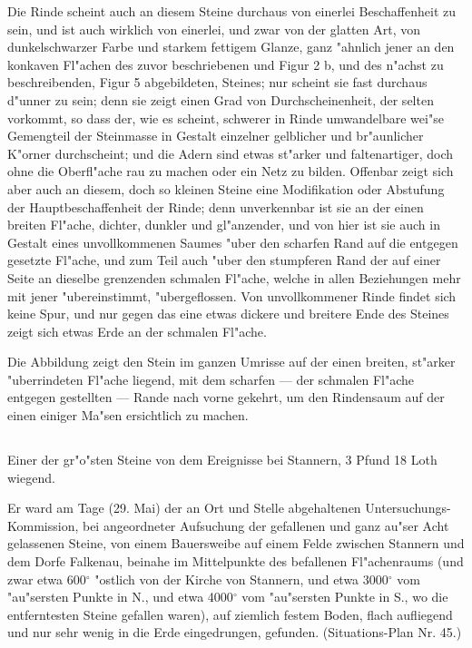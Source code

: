\documentclass[a4paper, 11pt, oneside, german]{article}
\begin{document}
Die Rinde scheint auch an diesem Steine durchaus von einerlei Beschaffenheit zu sein, und ist auch wirklich von einerlei, und zwar von der glatten Art, von dunkelschwarzer Farbe und starkem fettigem Glanze, ganz "ahnlich jener an den konkaven Fl"achen des zuvor beschriebenen und Figur 2 b, und des n"achst zu beschreibenden, Figur 5 abgebildeten, Steines; nur scheint sie fast durchaus d"unner zu sein; denn sie zeigt einen Grad von Durchscheinenheit, der selten vorkommt, so dass der, wie es scheint, schwerer in Rinde umwandelbare wei"se Gemengteil der Steinmasse in Gestalt einzelner gelblicher und br"aunlicher K"orner durchscheint; und die Adern sind etwas st"arker und faltenartiger, doch ohne die Oberfl"ache rau zu machen oder ein Netz zu bilden. Offenbar zeigt sich aber auch an diesem, doch so kleinen Steine eine Modifikation oder Abstufung der Hauptbeschaffenheit der Rinde; denn unverkennbar ist sie an der einen breiten Fl"ache, dichter, dunkler und gl"anzender, und von hier ist sie auch in Gestalt eines unvollkommenen Saumes "uber den scharfen Rand auf die entgegen gesetzte Fl"ache, und zum Teil auch "uber den stumpferen Rand der auf einer Seite an dieselbe grenzenden schmalen Fl"ache, welche in allen Beziehungen mehr mit jener "ubereinstimmt, "ubergeflossen. Von unvollkommener Rinde findet sich keine Spur, und nur gegen das eine etwas dickere und breitere Ende des Steines zeigt sich etwas Erde an der schmalen Fl"ache.

Die Abbildung zeigt den Stein im ganzen Umrisse auf der einen breiten, st"arker "uberrindeten Fl"ache liegend, mit dem scharfen --- der schmalen Fl"ache entgegen gestellten --- Rande nach vorne gekehrt, um den Rindensaum auf der einen einiger Ma"sen ersichtlich zu machen.

\subsection{}
\paragraph{}
Einer der gr"o"sten Steine von dem Ereignisse bei Stannern, 3 Pfund 18 Loth wiegend.

Er ward am Tage (29. Mai) der an Ort und Stelle abgehaltenen Untersuchungs-Kommission, bei angeordneter Aufsuchung der gefallenen und ganz au"ser Acht gelassenen Steine, von einem Bauersweibe auf einem Felde zwischen Stannern und dem Dorfe Falkenau, beinahe im Mittelpunkte des befallenen Fl"achenraums (und zwar etwa 600$^{\circ}$ "ostlich von der Kirche von Stannern, und etwa 3000$^{\circ}$ vom "au"sersten Punkte in N., und etwa 4000$^{\circ}$ vom "au"sersten Punkte in S., wo die entferntesten Steine gefallen waren), auf ziemlich festem Boden, flach aufliegend und nur sehr wenig in die Erde eingedrungen, gefunden. (Situations-Plan Nr. 45.)
\end{document}

